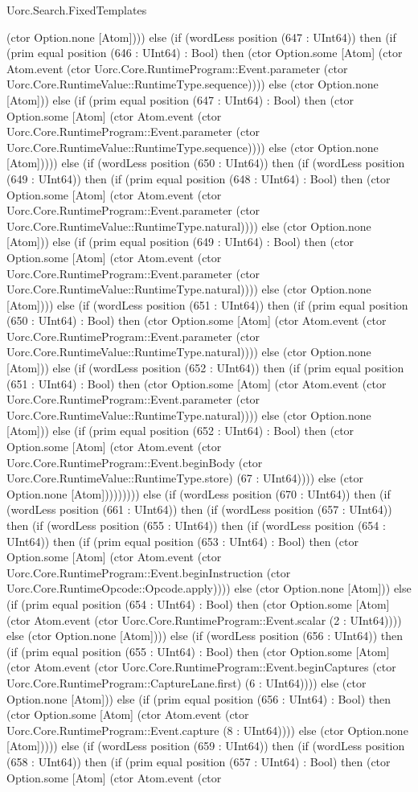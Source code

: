 \begin{lexlean}{Uorc.Search.FixedTemplates}
\begin{semanticmodule}
{(ctor Option.none [Atom]))) else (if (wordLess position (647 : UInt64)) then (if (prim equal position (646 : UInt64) : Bool) then (ctor Option.some [Atom] (ctor Atom.event (ctor Uorc.Core.RuntimeProgram::Event.parameter (ctor Uorc.Core.RuntimeValue::RuntimeType.sequence)))) else (ctor Option.none [Atom])) else (if (prim equal position (647 : UInt64) : Bool) then (ctor Option.some [Atom] (ctor Atom.event (ctor Uorc.Core.RuntimeProgram::Event.parameter (ctor Uorc.Core.RuntimeValue::RuntimeType.sequence)))) else (ctor Option.none [Atom])))) else (if (wordLess position (650 : UInt64)) then (if (wordLess position (649 : UInt64)) then (if (prim equal position (648 : UInt64) : Bool) then (ctor Option.some [Atom] (ctor Atom.event (ctor Uorc.Core.RuntimeProgram::Event.parameter (ctor Uorc.Core.RuntimeValue::RuntimeType.natural)))) else (ctor Option.none [Atom])) else (if (prim equal position (649 : UInt64) : Bool) then (ctor Option.some [Atom] (ctor Atom.event (ctor Uorc.Core.RuntimeProgram::Event.parameter (ctor Uorc.Core.RuntimeValue::RuntimeType.natural)))) else (ctor Option.none [Atom]))) else (if (wordLess position (651 : UInt64)) then (if (prim equal position (650 : UInt64) : Bool) then (ctor Option.some [Atom] (ctor Atom.event (ctor Uorc.Core.RuntimeProgram::Event.parameter (ctor Uorc.Core.RuntimeValue::RuntimeType.natural)))) else (ctor Option.none [Atom])) else (if (wordLess position (652 : UInt64)) then (if (prim equal position (651 : UInt64) : Bool) then (ctor Option.some [Atom] (ctor Atom.event (ctor Uorc.Core.RuntimeProgram::Event.parameter (ctor Uorc.Core.RuntimeValue::RuntimeType.natural)))) else (ctor Option.none [Atom])) else (if (prim equal position (652 : UInt64) : Bool) then (ctor Option.some [Atom] (ctor Atom.event (ctor Uorc.Core.RuntimeProgram::Event.beginBody (ctor Uorc.Core.RuntimeValue::RuntimeType.store) (67 : UInt64)))) else (ctor Option.none [Atom])))))))) else (if (wordLess position (670 : UInt64)) then (if (wordLess position (661 : UInt64)) then (if (wordLess position (657 : UInt64)) then (if (wordLess position (655 : UInt64)) then (if (wordLess position (654 : UInt64)) then (if (prim equal position (653 : UInt64) : Bool) then (ctor Option.some [Atom] (ctor Atom.event (ctor Uorc.Core.RuntimeProgram::Event.beginInstruction (ctor Uorc.Core.RuntimeOpcode::Opcode.apply)))) else (ctor Option.none [Atom])) else (if (prim equal position (654 : UInt64) : Bool) then (ctor Option.some [Atom] (ctor Atom.event (ctor Uorc.Core.RuntimeProgram::Event.scalar (2 : UInt64)))) else (ctor Option.none [Atom]))) else (if (wordLess position (656 : UInt64)) then (if (prim equal position (655 : UInt64) : Bool) then (ctor Option.some [Atom] (ctor Atom.event (ctor Uorc.Core.RuntimeProgram::Event.beginCaptures (ctor Uorc.Core.RuntimeProgram::CaptureLane.first) (6 : UInt64)))) else (ctor Option.none [Atom])) else (if (prim equal position (656 : UInt64) : Bool) then (ctor Option.some [Atom] (ctor Atom.event (ctor Uorc.Core.RuntimeProgram::Event.capture (8 : UInt64)))) else (ctor Option.none [Atom])))) else (if (wordLess position (659 : UInt64)) then (if (wordLess position (658 : UInt64)) then (if (prim equal position (657 : UInt64) : Bool) then (ctor Option.some [Atom] (ctor Atom.event (ctor }
\end{semanticmodule}
\end{lexlean}
